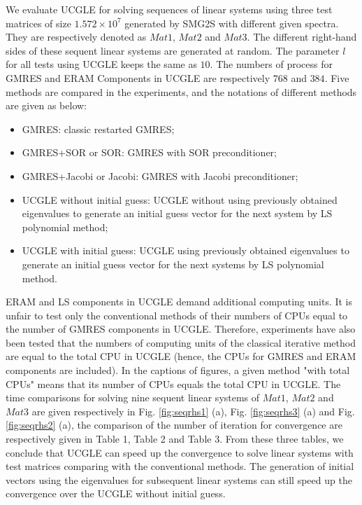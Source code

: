 We evaluate UCGLE for solving sequences of linear systems using three test matrices of size $1.572\times10^7$ generated by SMG2S with different given spectra. They are respectively denoted as $Mat1$, $Mat2$ and $Mat3$. The different right-hand sides of these sequent linear systems are generated at random. The parameter $l$ for all tests using UCGLE keeps the same as $10$. The numbers of process for GMRES and ERAM Components in UCGLE are respectively $768$ and $384$. Five methods are compared in the experiments, and the notations of different methods are given as below:

\begin{itemize}
	\item GMRES: classic restarted GMRES;
	\item GMRES+SOR or SOR: GMRES with SOR preconditioner;
	\item GMRES+Jacobi or Jacobi: GMRES with Jacobi preconditioner;
	\item UCGLE without initial guess: UCGLE without using previously obtained eigenvalues to generate an initial guess vector for the next system by LS polynomial method;
	\item UCGLE with initial guess: UCGLE using previously obtained eigenvalues to generate an initial guess vector for the next systems by LS polynomial method.
\end{itemize}

ERAM and LS components in UCGLE demand additional computing units. It is unfair to test only the conventional methods of their numbers of CPUs equal to the number of GMRES components in UCGLE. Therefore, experiments have also been tested that the numbers of computing units of the classical iterative method are equal to the total CPU in UCGLE (hence, the CPUs for GMRES and ERAM components are included). In the captions of figures, a given method "with total CPUs" means that its number of CPUs equals the total CPU in UCGLE. The time comparisons for solving nine sequent linear systems of $Mat1$, $Mat2$ and $Mat3$ are given respectively in Fig. \ref{fig:seqrhs1} (a), Fig. \ref{fig:seqrhs3} (a) and Fig. \ref{fig:seqrhs2} (a), the comparison of the number of iteration for convergence are respectively given in Table 1, Table 2 and Table 3. From these three tables, we conclude that UCGLE can speed up the convergence to solve linear systems with test matrices comparing with the conventional methods. The generation of initial vectors using the eigenvalues for subsequent linear systems can still speed up the convergence over the UCGLE without initial guess.

